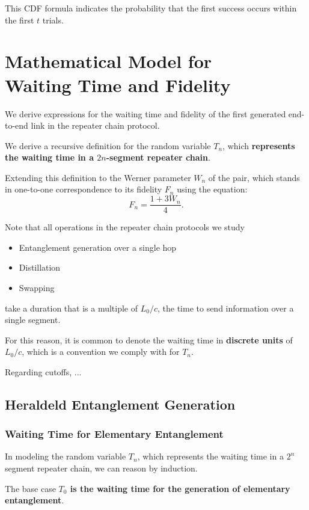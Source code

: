 \documentclass{masterthesis}
\begin{document}
This CDF formula indicates the probability that the first success occurs within the first \( t \) trials.

\chapter*{Mathematical Model for \\ Waiting Time and Fidelity}

We derive expressions for the waiting time and fidelity of the first generated end-to-end link in the repeater chain protocol. 

We derive a recursive definition for the random variable $T_n$, which \textbf{represents the waiting time in a $2n$-segment repeater chain}.

Extending this definition to the Werner parameter $W_n$ of the pair, which stands in one-to-one correspondence to its fidelity $F_n$ using the equation:
\begin{equation}
    F_n = \frac{1 + 3 W_n}{4}.
\end{equation}

Note that all operations in the repeater chain protocols we study
\begin{itemize}
    \item Entanglement generation over a single hop
    \item Distillation
    \item Swapping
\end{itemize}
take a duration that is a multiple of ${L_0}/{c}$, the time to send information over a single segment.

For this reason, it is common to denote the waiting time in \textbf{discrete units} of ${L_0}/{c}$, which is a convention we comply with for $T_n$.

Regarding cutoffs, ... %

\section*{Heraldeld Entanglement Generation}

\subsection*{Waiting Time for Elementary Entanglement}
In modeling the random variable $T_n$, which represents the waiting time in a $2^n$ segment repeater chain, we can reason by induction.

The base case \textbf{$T_0$ is the waiting time for the generation of elementary entanglement}.
\end{document}
